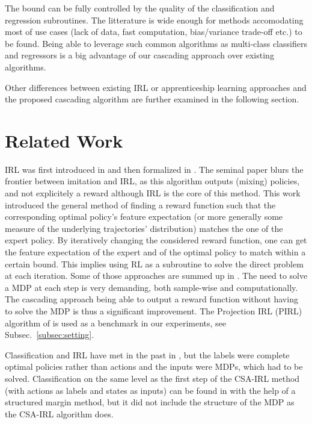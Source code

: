 \documentclass[smallextended]{svjour3}
\begin{document}
The bound can be fully controlled by the quality of the classification and regression subroutines. The litterature is wide enough for methods accomodating most of use cases (lack of data, fast computation, bias/variance trade-off etc.) to be found. Being able to leverage such common algorithms as multi-class classifiers and regressors is a big advantage of our cascading approach over existing algorithms.

Other differences between existing IRL or apprenticeship learning approaches and the proposed cascading algorithm are further examined in the following section.

\section{Related Work}
\label{sec:related}
IRL was first introduced in \cite{russell1998learning} and then formalized in \cite{ng2000algorithms}. The seminal paper \cite{abbeel2004apprenticeship} blurs the frontier between imitation and IRL, as this algorithm outputs (mixing) policies, and not explicitely a reward although IRL is the core of this method. This work introduced the general method of finding a reward function such that the corresponding optimal policy's feature expectation (or
more generally some measure of the underlying trajectories'
distribution) matches the one of the expert policy. By iteratively changing the considered reward function, one can get the feature expectation of the expert and of the optimal policy to match within a certain bound. This implies using RL as a subroutine to solve the direct problem at each iteration. Some of those approaches are summed up in \cite{neu2009training}. The need to solve a MDP at each step is very demanding, both sample-wise and computationally. The cascading approach being able to output a reward function without having to solve the MDP is thus a significant improvement.
The Projection IRL (PIRL) algorithm of \cite{abbeel2004apprenticeship} is used as a benchmark in our experiments, see Subsec.~\ref{subsec:setting}. 

Classification and IRL have met in the past in \cite{ratliff2006maximum}, but the labels were complete optimal policies rather than actions and the inputs were MDPs, which had to be solved. Classification on the same level as the first step of the CSA-IRL method (with actions as labels and states as inputs) can be found in \cite{ratliff2007imitation} with the help of a structured margin method, but it did not include the structure of the MDP as the CSA-IRL algorithm does.
\end{document}
